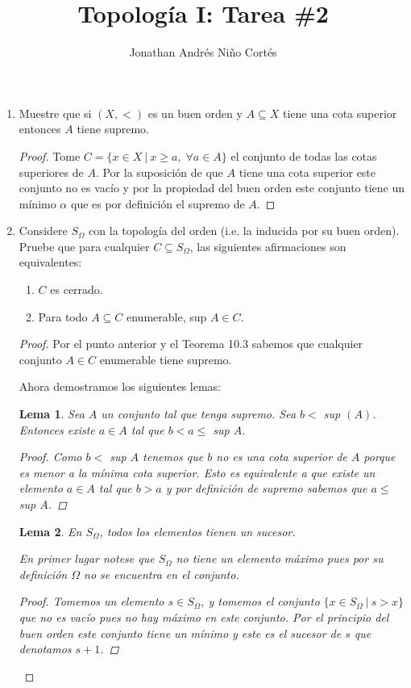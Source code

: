\documentclass[letter,twoside,11pt]{article}
\title{Topolog\'ia I: Tarea \#2}
\author{Jonathan Andr\'es Ni\~no Cort\'es}
\newtheorem{lemma}{Lema}
\begin{document}
\maketitle
\begin{enumerate}
\item Muestre que si $(X,<)$ es un buen orden y $A \subseteq X$ tiene una cota superior entonces $A$ tiene supremo.
\begin{proof}
Tome $C=\{x\in X\:|\:x\geq a, \;\forall a \in A \}$ el conjunto de todas las cotas superiores de $A$. Por la suposici\'on de que $A$ tiene una cota superior este conjunto no es vac\'io y por la propiedad del buen orden este conjunto tiene un m\'inimo $\alpha$ que es por definici\'on el supremo de $A$.
\end{proof}
\item Considere $S_{\Omega}$ con la topolog\'ia del orden (i.e. la inducida por su buen orden). Pruebe que para cualquier $C \subseteq S_{\Omega}$, las siguientes afirmaciones son equivalentes:
\begin{enumerate}
\item $C$ es cerrado.
\item Para todo $A \subseteq C$ enumerable, sup $A \in C$.
\end{enumerate}
\begin{proof}
Por el punto anterior y el Teorema 10.3 sabemos que cualquier conjunto $A \in C$ enumerable tiene supremo.

Ahora demostramos los siguientes lemas:
\begin{lemma}
Sea $A$ un conjunto tal que tenga supremo. Sea $b <$ sup $(A)$. Entonces existe $a \in A$ tal que $b < a \leq$ sup $A$.
\begin{proof}
Como $b<$ sup $A$ tenemos que $b$ no es una cota superior de $A$ porque es menor a la m\'inima cota superior. Esto es equivalente a que existe un elemento $a \in A$ tal que $b>a$ y por definici\'on de supremo sabemos que $a \leq$ sup $A$. 
\end{proof}
\end{lemma}
\begin{lemma}
En $S_{\Omega}$, todos los elementos tienen un sucesor.

En primer lugar notese que $S_{\Omega}$ no tiene un elemento m\'aximo pues por su definici\'on $\Omega$ no se encuentra en el conjunto.

\begin{proof}
Tomemos un elemento $s \in S_{\Omega}$, y tomemos el conjunto $\{x \in S_{\Omega} \:|\:s > x \}$ que no es vac\'io pues no hay m\'aximo en este conjunto. Por el principio del buen orden este conjunto tiene un m\'inimo y este es el sucesor de $s$ que denotamos $s+1$. 
\end{proof}
\end{lemma}


\end{proof}
\end{enumerate}
\end{document}
